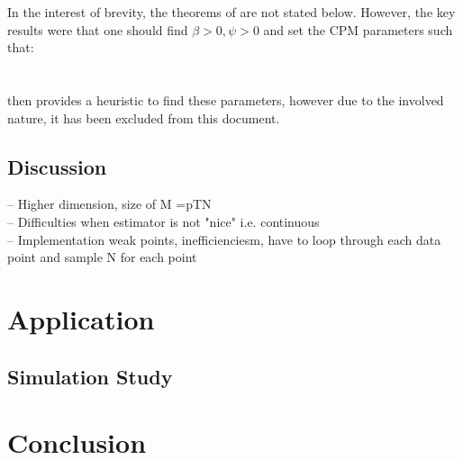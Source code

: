 \documentclass{article}
\begin{document}
In the interest of brevity, the theorems of \cite{cpmmDeligiannidis2015} are not stated below. However, the key results were that one should find $\beta>0, \psi>0$ and set the CPM parameters such that: \\

\\

 \\

\cite{cpmmDeligiannidis2015} then provides a heuristic to find these parameters, however due to the involved nature, it has been excluded from this document.



\subsection{Discussion}
    -- Higher dimension, size of M =pTN \\
    -- Difficulties when estimator is not "nice" i.e. continuous \\
    -- Implementation weak points, inefficienciesm, have to loop through each data point and sample N for each point



  \section{Application}

  \subsection{Simulation Study}

  \section{Conclusion}
\end{document}
